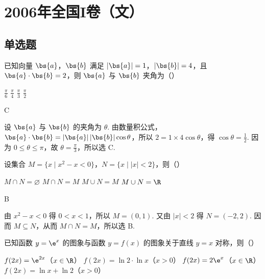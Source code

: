 \chapter{2006年全国I卷（文）}
\section{单选题}
\begin{problem}
已知向量 \(\bs{a}\)，\(\bs{b}\) 满足 \(|\bs{a}| = 1\)，\(|\bs{b}| = 4\)，且 \(\bs{a} \cdot \bs{b} = 2\)，则 \(\bs{a}\) 与 \(\bs{b}\) 夹角为（\quad）

\choices
    {\(\frac{\pi}{6}\)}
    {\(\frac{\pi}{4}\)}
    {\(\frac{\pi}{3}\)}
    {\(\frac{\pi}{2}\)}
\end{problem}

\begin{answer}
C
\end{answer}

\begin{solution}
设 \(\bs{a}\) 与 \(\bs{b}\) 的夹角为 \(\theta\). 由数量积公式，
\(\bs{a}\cdot\bs{b}=|\bs{a}|\,|\bs{b}|\cos\theta\)，所以 \(2=1\times4\cos\theta\)，得 \(\cos\theta=\frac{1}{2}\). 因为 \(0\leqslant\theta\leqslant\pi\)，故 \(\theta=\frac{\pi}{3}\)，所以选 C.
\end{solution}

\begin{problem}
设集合 \(M = \{x \mid x^2 - x < 0\}\)，\(N = \{x \mid |x| < 2\}\)，则（\quad）

\choices
    {\(M \cap N = \varnothing\)}
    {\(M \cap N = M\)}
    {\(M \cup N = M\)}
    {\(M \cup N = \R\)}
\end{problem}

\begin{answer}
B
\end{answer}

\begin{solution}
由 \(x^{2}-x<0\) 得 \(0<x<1\)，所以 \(M=(0,1)\). 又由 \(|x|<2\) 得 \(N=(-2,2)\). 因而 \(M\subseteq N\)，从而 \(M\cap N=M\)，所以选 B.
\end{solution}

\begin{problem}
已知函数 \( y = \e^{x} \) 的图象与函数 \( y = f(x) \) 的图象关于直线 \( y = x \) 对称，则（\quad）

\choices
    {\(f(2x) = \e^{2x}\)（\(x\in \R\)）}
    {\(f(2x) = \ln 2\cdot \ln x\)（\(x > 0\)）}
    {\(f(2x) = 2\e^{x}\)（\(x\in \R\)）}
    {\(f(2x) = \ln x + \ln 2\)（\(x > 0\)）}
\end{problem}

